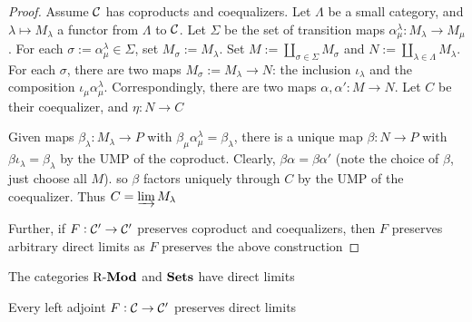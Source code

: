 \documentclass[11pt]{article}
\begin{document}
\begin{proof}
Assume \(\mathcal{C}\) has coproducts and coequalizers. Let \(\Lambda\) be a small category,
and \(\lambda\mapsto M_\lambda\) a functor from \(\Lambda\) to \(\mathcal{C}\). Let
\(\Sigma\) be the set of transition maps \(\alpha_\mu^\lambda:M_\lambda\to M_\mu\). For each
\(\sigma:=\alpha_\mu^\lambda\in\Sigma\), set \(M_\sigma:=M_\lambda\). Set
\(M:=\coprod_{\sigma\in\Sigma}M_\sigma\) and \(N:=\coprod_{\lambda\in\Lambda}
   M_\lambda\). For each \(\sigma\), there are two maps \(M_\sigma:=M_\lambda\to N\): the
inclusion \(\iota_\lambda\) and the composition
\(\iota_\mu\alpha_\mu^\lambda\). Correspondingly, there are two maps
\(\alpha,\alpha':M\to N\). Let \(C\) be their coequalizer, and \(\eta:N\to C\)

Given maps \(\beta_\lambda:M_\lambda\to P\) with
\(\beta_\mu\alpha_\mu^\lambda=\beta_\lambda\), there is a unique map \(\beta:N\to
   P\) with \(\beta\iota_\lambda=\beta_\lambda\) by the UMP of the coproduct.
Clearly, \(\beta\alpha=\beta\alpha'\) (note the choice of \(\beta\), just choose all
\(M\)). so \(\beta\) factors uniquely through \(C\) by the UMP of the coequalizer.
Thus \(C=\varinjlim M_\lambda\)

Further, if \(F:\mathcal{C}'\to\mathcal{C}'\) preserves coproduct and coequalizers, then
\(F\) preserves arbitrary direct limits as \(F\) preserves the above construction
\end{proof}

\begin{theorem}[]
\label{6.11} The categories \(\operatorname{R-\textbf{Mod}}\) and \(\operatorname{\textbf{Sets}}\) have direct limits
\end{theorem}

\begin{theorem}[]
\label{6.12}
Every left adjoint \(F:\mathcal{C}\to\mathcal{C}'\) preserves direct limits
\end{theorem}
\end{document}
